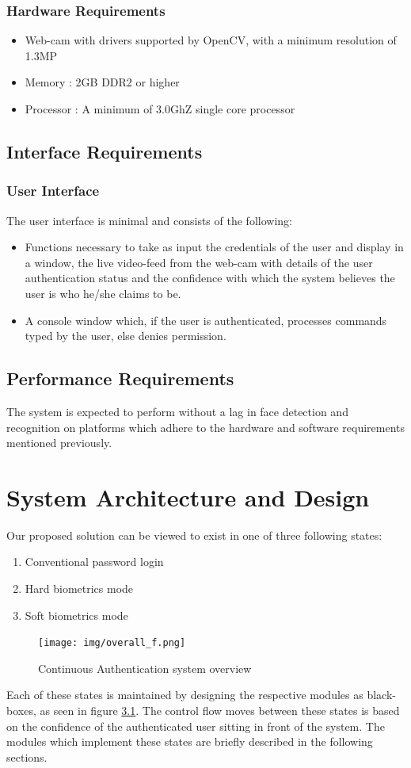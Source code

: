 \documentclass[12pt]{report}			%
\begin{document}
\subsection{ Hardware Requirements }
\begin{itemize}
\item Web-cam with drivers supported by OpenCV, with a minimum resolution of 1.3MP
\item Memory : 2GB DDR2 or higher
\item Processor : A minimum of 3.0GhZ single core processor
\end{itemize}

\section{ Interface Requirements }
\subsection{ User Interface }
The user interface is minimal and consists of the following:
\begin{itemize}
\item Functions necessary to take as input the credentials of the user and display in a window, the live video-feed from the web-cam with details of the user authentication status and the confidence with which the system believes the user is who he/she claims to be.
\item A console window which, if the user is authenticated, processes commands typed by the user, else denies permission. 
\end{itemize}
  
\section{ Performance Requirements }
The system is expected to perform without a lag in face detection and recognition on platforms which adhere to the hardware and software requirements mentioned previously.

\chapter{ System Architecture and Design }  
Our proposed solution can be viewed to exist in one of three following states:
\begin{enumerate}
	\item Conventional password login
	\item Hard biometrics mode
	\item Soft biometrics mode
\end{enumerate}
\begin{figure}[h!]
	\centering
	\texttt{[image: img/overall\_f.png]}
	\caption{Continuous Authentication system overview}
	\label{fig:ca_overview}
\end{figure}
Each of these states is maintained by designing the respective modules as black-boxes, as seen in figure \ref{fig:ca_overview}.
The control flow moves between these states is based on the confidence of the authenticated user sitting in front of the system.
The modules which implement these states are briefly described in the following sections.
\end{document}
